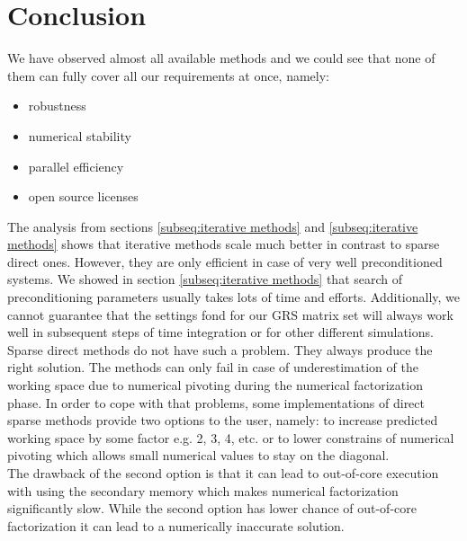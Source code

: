 \section{Conclusion}
\label{subseq:hybrid-method-description}


We have observed almost all available methods and we could see that none of them can fully cover all our requirements at once, namely:

\begin{itemize}
	\item robustness
	\item numerical stability
	\item parallel efficiency
	\item open source licenses
\end{itemize}


The analysis from sections \ref{subseq:iterative methods} and \ref{subseq:iterative methods} shows that iterative methods scale much better in contrast to sparse direct ones. However, they are only efficient in case of very well preconditioned systems. We showed in section \ref{subseq:iterative methods} that search of preconditioning parameters usually takes lots of time and efforts. Additionally, we cannot guarantee that the settings fond for our GRS matrix set will always work well in subsequent steps of time integration or for other different simulations.\\


Sparse direct methods do not have such a problem. They always produce the right solution. The methods can only fail in case of underestimation of the working space due to numerical pivoting during the numerical factorization phase. In order to cope with that problems, some implementations of direct sparse methods provide two options to the user, namely: to increase predicted working space by some factor e.g. 2, 3, 4, etc. or to lower constrains of numerical pivoting which allows small numerical values to stay on the diagonal.\\


The drawback of the second option is that it can lead to out-of-core execution with using the secondary memory which makes numerical factorization significantly slow. While the second option has lower chance of out-of-core factorization it can lead to a numerically inaccurate solution. \\


